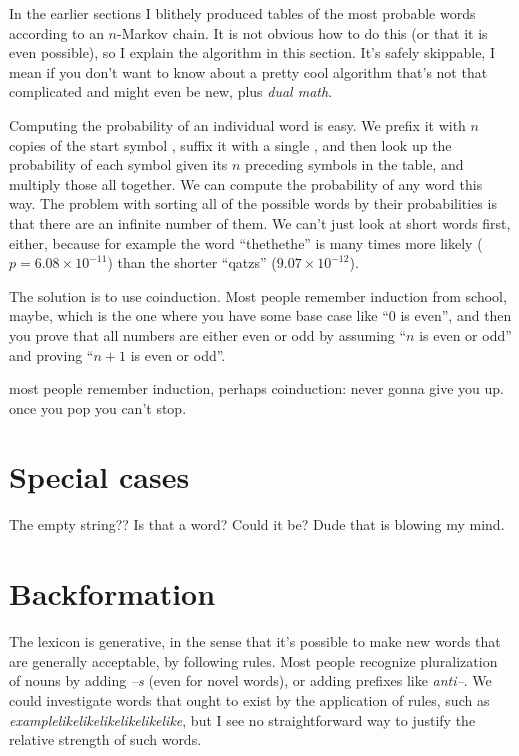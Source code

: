 \documentclass[twocolumn]{article}
\begin{document}
In the earlier sections I blithely produced tables of the most
probable words according to an $n$-Markov chain. It is not obvious how
to do this (or that it is even possible), so I explain the algorithm
in this section. It's safely skippable, I mean if you don't want to
know about a pretty cool algorithm that's not that complicated and
might even be new, plus {\em dual math}.

Computing the probability of an individual word is easy. We prefix it
with $n$ copies of the start symbol \<, suffix it with a single \>,
and then look up the probability of each symbol given its $n$
preceding symbols in the table, and multiply those all together. We
can compute the probability of any word this way. The problem with
sorting all of the possible words by their probabilities is that there
are an infinite number of them. We can't just look at short words
first, either, because for example the word ``thethethe'' is many
times more likely ($p = 6.08\times 10^{-11}$) than the shorter
``qatzs'' ($9.07\times 10^{-12}$).

The solution is to use coinduction. Most people remember induction
from school, maybe, which is the one where you have some base case
like ``0 is even'', and then you prove that all numbers are either
even or odd by assuming ``$n$ is even or odd'' and proving ``$n + 1$
is even or odd''. 

most people remember induction, perhaps 
coinduction: never gonna give you up. once you pop you can't stop.

\section{Special cases}

The empty string?? Is that a word? Could it be? Dude that is blowing my mind.

\section{Backformation} \label{sec:backformation}

The lexicon is generative, in the sense that it's possible to make new
words that are generally acceptable, by following rules. Most people
recognize pluralization of nouns by adding {\it --s} (even for novel
words), or adding prefixes like {\it anti--}. We could investigate
words that ought to exist by the application of rules, such as {\it
  examplelikelikelikelikelikelike}, but I see no straightforward way
to justify the relative strength of such words.
\end{document}
